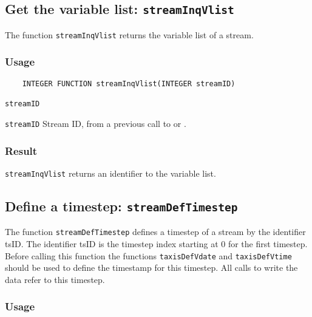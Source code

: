 \subsection{Get the variable list: \texttt{streamInqVlist}}
\label{streamInqVlist}

The function {\texttt{streamInqVlist}} returns the variable list of a stream.

\subsubsection*{Usage}

\begin{verbatim}
    INTEGER FUNCTION streamInqVlist(INTEGER streamID)
\end{verbatim}

\hspace*{4mm}\begin{minipage}[]{15cm}
\begin{deflist}{\texttt{streamID}\ }
\item[\texttt{streamID}]
Stream ID, from a previous call to {} or {}.

\end{deflist}
\end{minipage}

\subsubsection*{Result}

{\texttt{streamInqVlist}} returns an identifier to the variable list.



\subsection{Define a timestep: \texttt{streamDefTimestep}}
\label{streamDefTimestep}

The function {\texttt{streamDefTimestep}} defines a timestep of a stream by the identifier tsID.
The identifier tsID is the timestep index starting at 0 for the first timestep.
Before calling this function the functions {\texttt{taxisDefVdate}} and {\texttt{taxisDefVtime}} should be used
to define the timestamp for this timestep. All calls to write the data refer to this timestep.

\subsubsection*{Usage}

